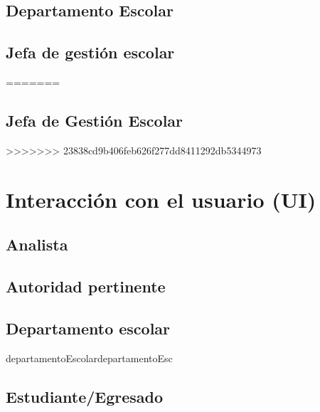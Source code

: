 \documentclass[oneside,10pt]{book}
\begin{document}
\section{Departamento Escolar}

\section{Jefa de gestión escolar}
=======
\section{Jefa de Gestión Escolar}
>>>>>>> 23838cd9b406feb626f277dd8411292db5344973

\chapter{Interacción con el usuario (UI)}
\section{Analista}
\section{Autoridad pertinente}
\section{Departamento escolar}
departamentoEscolardepartamentoEsc
\section{ Estudiante/Egresado}
\end{document}
